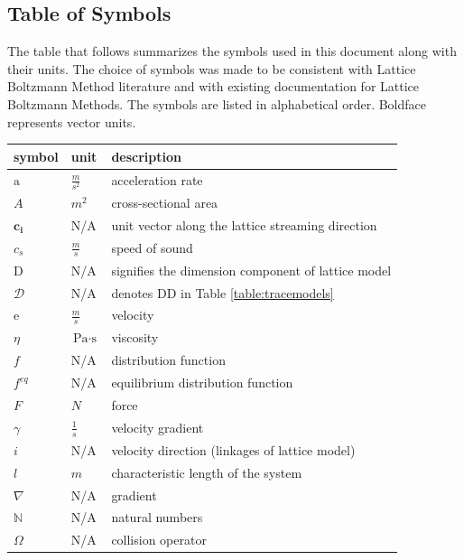 \documentclass[12pt]{article}
\begin{document}
\subsection{Table of Symbols}

The table that follows summarizes the symbols used in this document along with
their units.  The choice of symbols was made to be consistent with Lattice Boltzmann Method literature and with existing documentation for Lattice Boltzmann Methods. The symbols are listed in alphabetical order. Boldface represents vector units.

\renewcommand{\arraystretch}{1.2}
\noindent \begin{longtable*}{l l p{12cm}} \toprule
\textbf{symbol} & \textbf{unit} & \textbf{description}\\
\midrule 
$\mathrm{a}$ & $\frac{m}{s^2}$ & acceleration rate
\\
$A$ & $m^2$ & cross-sectional area
\\
$\textbf{c}_\textbf{i}$ & N/A & unit vector along the lattice streaming direction
\\
$c_s$ & $\frac{m}{s}$ & speed of sound
\\
$\mathrm{D}$ & N/A & signifies the dimension component of lattice model
\\
$\mathscr{D}$ & N/A & denotes DD in Table \ref{table:tracemodels}
\\
$\mathrm{e}$ & $\frac{m}{s}$ & velocity
\\
$\eta$ & $\si{\pascal}\cdot\si{\second}$ & viscosity %
\\ 
$f$ & N/A & distribution function
\\
$f^{eq}$ & N/A & equilibrium distribution function
\\
$F$ & $N$ & force
\\
$\gamma$ & $\frac{1}{s}$ & velocity gradient
\\
$i$ & N/A & velocity direction (linkages of lattice model)
\\
$l$ & $m$ & characteristic length of the system
\\
$\nabla$ & N/A & gradient
\\
$\mathbb{N}$ & N/A & natural numbers
\\
$\Omega$ & N/A & collision operator
\\

\end{longtable*}
\end{document}
